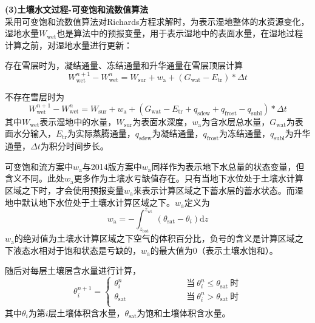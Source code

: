 \textbf {(3)土壤水文过程-可变饱和流数值算法}\\

采用可变饱和流数值算法对Richards方程求解时，为表示湿地整体的水资源变化，湿地水量$W_{\mathrm{wet}}$也是算法中的预报变量，用于表示湿地中的表面水量，在湿地过程计算之前，对湿地水量进行更新：

存在雪层时为，凝结通量、冻结通量和升华通量在雪层顶层计算
\begin{equation}
  W_{\mathrm{wet}}^{n+1}-W_{\mathrm{wet}}^{n}=W_{\mathrm{sur}}+w_{\mathrm{a}}+\left(G_{\mathrm{wat}}-E_{\mathrm{tr}}\right)*{\Delta t}
\end{equation}

不存在雪层时为
\begin{equation}
  W_{\mathrm{wet}}^{n+1}-W_{\mathrm{wet}}^{n}=W_{\mathrm{sur}}+w_{\mathrm{a}}+\left(G_{\mathrm{wat}}-E_{\mathrm{tr}}+q_{\mathrm{sdew}}+q_{\mathrm{frost}}-q_{\mathrm{subl}}\right)*{\Delta t}
\end{equation}
其中$W_{\mathrm{wet}}$表示湿地中的水量，$W_{\mathrm{sur}}$为表面水深度，$w_{\mathrm{a}}$为含水层总水量，$G_{\mathrm{wat}}$为表面水分输入，$E_{\mathrm{tr}}$为实际蒸腾通量，$q_{\mathrm{sdew}}$为凝结通量，$q_{\mathrm{frost}}$为冻结通量，$q_{\mathrm{subl}}$为升华通量，${\Delta t}$为积分时间步长。

可变饱和流方案中$w_{\mathrm {a}} $与2014版方案中$w_{\mathrm {a}} $同样作为表示地下水总量的状态变量，但含义不同。此处$w_{\mathrm {a}} $更多作为土壤水亏缺值存在。只有当地下水位处于土壤水计算区域之下时，才会使用预报变量$w_{\mathrm {a}} $来表示计算区域之下蓄水层的蓄水状态。而湿地中默认地下水位处于土壤水计算区域之下。$w_{\mathrm {a}} $定义为
\begin{equation}
  w_{\mathrm{a}}=-\int_{z_{\mathrm{bot}}}^{z_{\mathrm{w t}}}\left(\theta_{\mathrm {sat}}-\theta_{i}\right){\mathrm d} z
\end{equation}
$w_{\mathrm {a}} $的绝对值为土壤水计算区域之下空气的体积百分比，负号的含义是计算区域之下液态水相对于饱和状态是亏缺的，$w_{\mathrm {a}} $的最大值为0（表示土壤水饱和）。

随后对每层土壤层含水量进行计算，
\begin{equation}
  \theta_{i}^{n+1}=\begin{cases}
    \theta_{i}^{n} &\qquad \quad \qquad \quad \;\text{当}\ \theta_{i}^{n} \leqslant \theta_{\mathrm {sat}} \ \text{时} \\
    \theta_{\mathrm {sat}}     &\qquad \quad \qquad \quad \;\text{当}\ \theta_{i}^{n} > \theta_{\mathrm {sat}} \ \text{时} \\
  \end{cases}
\end{equation}
其中$\theta_{i}$为第$i$层土壤体积含水量，$\theta_{\mathrm {sat}}$为饱和土壤体积含水量。

